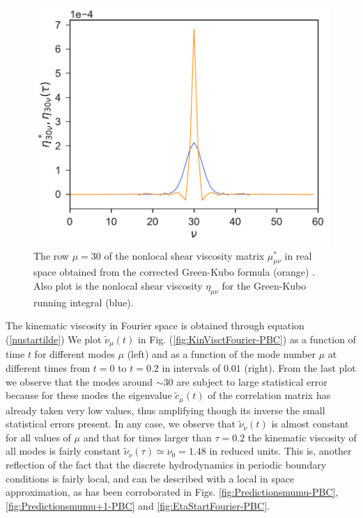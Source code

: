 \documentclass[b5paper,openright,10pt]{book}
\begin{document}
\begin{figure}[h!]
  \centering
\includegraphics[scale=0.41]{CompareEtas-PBC}
\caption[Comparison $\eta^*_{30,\nu}$ and $eta_{30,\nu}$ for an unconfined fluid]{The row $\mu=30$ of the nonlocal shear viscosity matrix $\mu^{*}_{\mu\nu}$ in real space obtained from the corrected Green-Kubo formula (orange) . Also plot is the nonlocal shear viscosity $\eta_{\mu\nu}$ for the Green-Kubo running integral (blue).}
\label{fig:CompareEtas-PBC}
\end{figure}


The kinematic viscosity  in Fourier space is  obtained through equation (\ref{nustartilde})
We plot $\tilde{\nu}_\mu(t)$  in Fig.  (\ref{fig:KinVisctFourier-PBC}) as a  function of time
$t$ for  different modes  $\mu$ (left)  and as a  function of  the mode
number $\mu$  at different times from $t=0$ to $t=0.2$ in intervals of $0.01$ (right). From
the last plot  we observe that the modes around  $\sim 30$ are subject
to  large statistical  error because  for these  modes the  eigenvalue
$\tilde{c}_\mu(t)$ of  the correlation  matrix has already  taken very
low values, thus  amplifying though its inverse  the small statistical
errors present. In  any case, we observe  that $\tilde{\nu}_\nu(t)$ is
almost constant for all values of $\mu$ and that for times larger than
$\tau=0.2$ the  kinematic viscosity  of all  modes is  fairly constant
$\tilde{\nu}_\nu(\tau)\simeq\nu_0=1.48$  in  reduced units.  This  is,
another reflection  of the  fact that the  discrete hydrodynamics in 
periodic boundary conditions is fairly local, and can be described with
 a local in space approximation, as has been corroborated in Figs. 
 \ref{fig:Predictionsmumu-PBC}, \ref{fig:Predictionsmumu+1-PBC} and \ref{fig:EtaStartFourier-PBC}.
\end{document}
